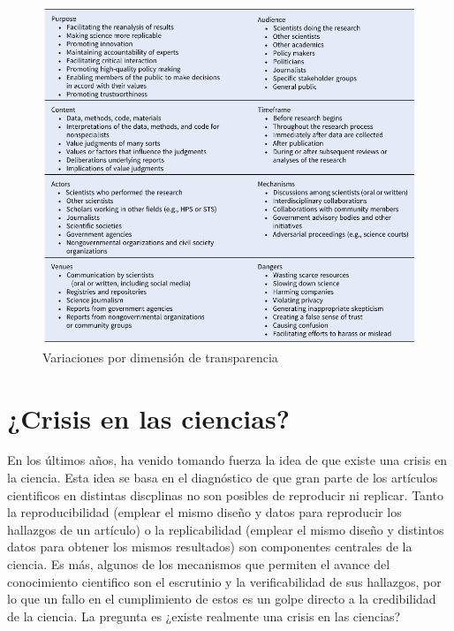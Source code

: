 \documentclass[
]{book}
\begin{document}
\begin{figure}

{\centering \includegraphics[width=1\linewidth]{docs/images/table_tax} 

}

\caption{Variaciones por dimensión de transparencia}\label{fig:tabtax}
\end{figure}

\hypertarget{crisis-en-las-ciencias}{%
\section{¿Crisis en las ciencias?}\label{crisis-en-las-ciencias}}

En los últimos años, ha venido tomando fuerza la idea de que existe una crisis en la ciencia. Esta idea se basa en el diagnóstico de que gran parte de los artículos cientificos en distintas discplinas no son posibles de reproducir ni replicar. Tanto la reproducibilidad (emplear el mismo diseño y datos para reproducir los hallazgos de un artículo) o la replicabilidad (emplear el mismo diseño y distintos datos para obtener los mismos resultados) son componentes centrales de la ciencia. Es más, algunos de los mecanismos que permiten el avance del conocimiento cientifico son el escrutinio y la verificabilidad de sus hallazgos, por lo que un fallo en el cumplimiento de estos es un golpe directo a la credibilidad de la ciencia. La pregunta es ¿existe realmente una crisis en las ciencias?
\end{document}
